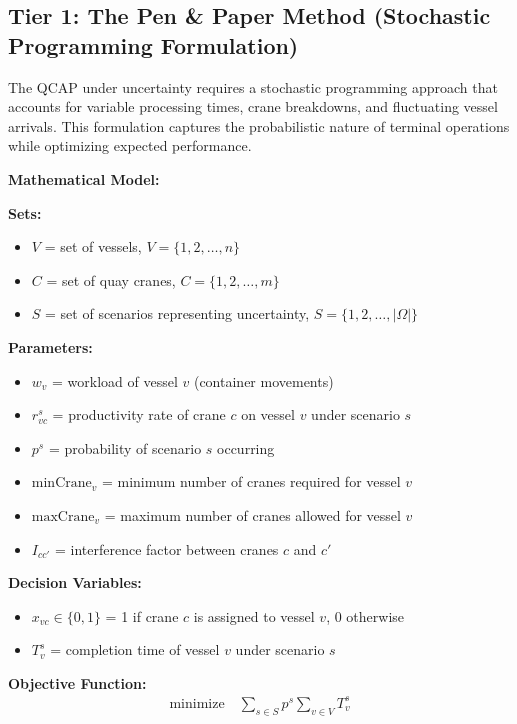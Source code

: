 \documentclass{article}
\begin{document}
\subsection{Tier 1: The Pen \& Paper Method (Stochastic Programming Formulation)}

The QCAP under uncertainty requires a stochastic programming approach that accounts for variable processing times, crane breakdowns, and fluctuating vessel arrivals. This formulation captures the probabilistic nature of terminal operations while optimizing expected performance.

\textbf{Mathematical Model:}

\textbf{Sets:}
\begin{itemize}
\item $V$ = set of vessels, $V = \{1, 2, \ldots, n\}$
\item $C$ = set of quay cranes, $C = \{1, 2, \ldots, m\}$
\item $S$ = set of scenarios representing uncertainty, $S = \{1, 2, \ldots, |\Omega|\}$
\end{itemize}

\textbf{Parameters:}
\begin{itemize}
\item $w_v$ = workload of vessel $v$ (container movements)
\item $r_{vc}^s$ = productivity rate of crane $c$ on vessel $v$ under scenario $s$
\item $p^s$ = probability of scenario $s$ occurring
\item $\text{minCrane}_v$ = minimum number of cranes required for vessel $v$
\item $\text{maxCrane}_v$ = maximum number of cranes allowed for vessel $v$
\item $I_{cc'}$ = interference factor between cranes $c$ and $c'$
\end{itemize}

\textbf{Decision Variables:}
\begin{itemize}
\item $x_{vc} \in \{0,1\}$ = 1 if crane $c$ is assigned to vessel $v$, 0 otherwise
\item $T_v^s$ = completion time of vessel $v$ under scenario $s$
\end{itemize}

\textbf{Objective Function:}
\begin{align}
\text{minimize} \quad \sum_{s \in S} p^s \sum_{v \in V} T_v^s
\end{align}
\end{document}
